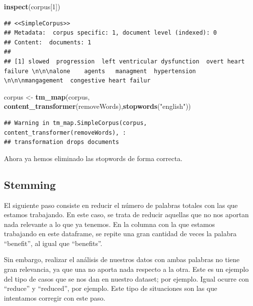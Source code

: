 \documentclass[spanish,]{article}
\newenvironment{Shaded}{\begin{snugshade}}{\end{snugshade}}
\newcommand{\KeywordTok}[1]{\textcolor[rgb]{0.13,0.29,0.53}{\textbf{#1}}}
\newcommand{\DecValTok}[1]{\textcolor[rgb]{0.00,0.00,0.81}{#1}}
\newcommand{\StringTok}[1]{\textcolor[rgb]{0.31,0.60,0.02}{#1}}
\newcommand{\NormalTok}[1]{#1}
\begin{document}
\begin{Shaded}
\begin{Highlighting}[]
\KeywordTok{inspect}\NormalTok{(corpus[}\DecValTok{1}\NormalTok{])}
\end{Highlighting}
\end{Shaded}

\begin{verbatim}
## <<SimpleCorpus>>
## Metadata:  corpus specific: 1, document level (indexed): 0
## Content:  documents: 1
## 
## [1] slowed  progression  left ventricular dysfunction  overt heart failure \n\n\nalone    agents   managment  hypertension \n\n\nmangagement  congestive heart failur
\end{verbatim}

\begin{Shaded}
\begin{Highlighting}[]
\NormalTok{corpus <-}\StringTok{ }\KeywordTok{tm_map}\NormalTok{(corpus, }\KeywordTok{content_transformer}\NormalTok{(removeWords),}\KeywordTok{stopwords}\NormalTok{(}\StringTok{"english"}\NormalTok{))}
\end{Highlighting}
\end{Shaded}

\begin{verbatim}
## Warning in tm_map.SimpleCorpus(corpus, content_transformer(removeWords), :
## transformation drops documents
\end{verbatim}

Ahora ya hemos eliminado las stopwords de forma correcta.

\subsection{Stemming}\label{stemming}

El siguiente paso consiste en reducir el número de palabras totales con
las que estamos trabajando. En este caso, se trata de reducir aquellas
que no nos aportan nada relevante a lo que ya tenemos. En la columna con
la que estamos trabajando en este dataframe, se repite una gran cantidad
de veces la palabra ``benefit'', al igual que ``benefits''.

Sin embargo, realizar el análisis de nuestros datos con ambas palabras
no tiene gran relevancia, ya que una no aporta nada respecto a la otra.
Este es un ejemplo del tipo de casos que se nos dan en nuestro dataset;
por ejemplo. Igual ocurre con ``reduce'' y ``reduced'', por ejemplo.
Este tipo de situaciones son las que intentamos corregir con este paso.
\end{document}
